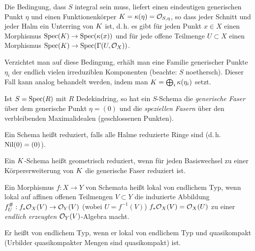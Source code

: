 \documentclass[german]{scrreprt}
\begin{document}
\begin{Definition}[Dedekindring]
  \begin{Bemerkung}
    Die Bedingung, dass $S$ integral sein muss, liefert einen eindeutigen
    generischen Punkt $\eta$ und einen Funktionenkörper
    $K=\kappa(\eta)=\mathcal{O}_{S,\eta}$, so dass jeder Schnitt und jeder Halm ein
    Unterring von $K$ ist, d.\,h. es gibt für jeden Punkt $x\in X$ einen
    Morphismus $\operatorname{Spec}(K)\to\operatorname{Spec}(\kappa(x))$ und für jede offene Teilmenge
    $U\subset X$ einen Morphismus $\operatorname{Spec}(K)\to\operatorname{Spec}(\Gamma(U,\mathcal{O}_X))$.

    Verzichtet man auf diese Bedingung, erhält man eine Familie
    generischer Punkte $\eta_i$ der endlich vielen irreduziblen
    Komponenten (beachte: $S$ noethersch). Dieser Fall kann analog
    behandelt werden, indem man $K=\bigoplus_i \kappa(\eta_i)$ setzt.
  \end{Bemerkung}

  \begin{Bemerkung}
    Ist $S=\operatorname{Spec}(R)$ mit $R$ Dedekindring, so hat ein $S$-Schema die
    \emph{generische Faser} über dem generische Punkt $\eta=(0)$ und die
    \emph{speziellen Fasern} über den verbleibenden Maximalidealen
    (geschlossenen Punkten).
  \end{Bemerkung}
\end{Definition}


\begin{Definition}
  Ein Schema heißt reduziert, falls alle Halme reduzierte Ringe sind
  (d.\,h. $\operatorname{Nil}(0)=(0)$).

  Ein $K$-Schema heißt geometrisch reduziert, wenn für jeden
  Basiswechsel zu einer Körpererweiterung von $K$ die generische
  Faser reduziert ist. 
\end{Definition}


\begin{Definition}
  Ein Morphismus $f\colon X\to Y$ von Schemata heißt lokal von endlichem
  Typ, wenn lokal auf affinen offenen Teilmengen $V\subset Y$ die
  induzierte Abbildung $f_U^\#: f_\ast\mathcal{O}_X(V)\to \mathcal{O}_Y(V)$
  (wobei $U=f^{-1}(V)$) $f_\ast\mathcal{O}_X(V)=\mathcal{O}_X(U)$ zu einer \emph{endlich erzeugten}
  $\mathcal{O}_Y(V)$-Algebra macht.

  Er heißt von endlichem Typ, wenn er lokal von endlichem Typ und
  quasikompakt (Urbilder quasikompakter Mengen sind quasikompakt) ist.
\end{Definition}
\end{document}
